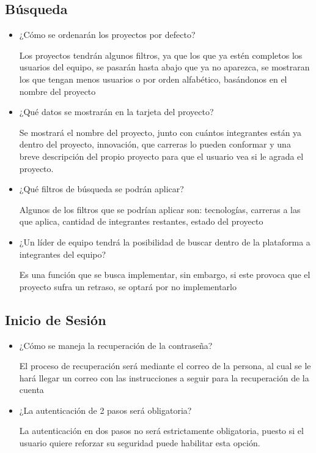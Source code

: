 	\subsection{Búsqueda}

	\begin{itemize}
		\item ¿Cómo se ordenarán los proyectos por defecto?

			Los proyectos tendrán algunos filtros, ya que los que ya estén completos los
			usuarios del equipo, se pasarán hasta abajo que ya no aparezca, se mostraran
			los que tengan menos usuarios o por orden alfabético, basándonos en el nombre
			del proyecto

		\item ¿Qué datos se mostrarán en la tarjeta del proyecto?

			Se mostrará el nombre del proyecto, junto con cuántos integrantes están ya
			dentro del proyecto, innovación, que carreras lo pueden conformar y una
			breve descripción del propio proyecto para que el usuario vea si le agrada
			el proyecto.

		\item ¿Qué filtros de búsqueda se podrán aplicar?

			Algunos de los filtros que se podrían aplicar son: tecnologías, carreras a las
			que aplica, cantidad de integrantes restantes, estado del proyecto

		\item ¿Un líder de equipo tendrá la posibilidad de buscar dentro de la plataforma
			a integrantes del equipo?

			Es una función que se busca implementar, sin embargo, si este provoca que el
			proyecto sufra un retraso, se optará por no implementarlo
	\end{itemize}

	\subsection{Inicio de Sesión}

	\begin{itemize}
		\item ¿Cómo se maneja la recuperación de la contraseña?

			El proceso de recuperación será mediante el correo de la persona, al cual se
			le hará llegar un correo con las instrucciones a seguir para la recuperación
			de la cuenta

		\item ¿La autenticación de 2 pasos será obligatoria?

			La autenticación en dos pasos no será estrictamente obligatoria, puesto si
			el usuario quiere reforzar su seguridad puede habilitar esta opción.
	\end{itemize}

